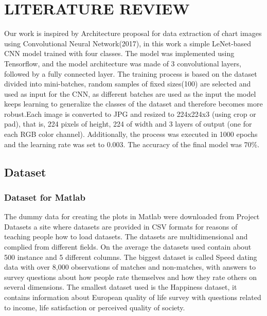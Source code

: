 \documentclass[12pt, a4paper,oneside]{report}
\begin{document}
\chapter{LITERATURE REVIEW}
Our work is inspired by Architecture proposal for data extraction of chart images using Convolutional Neural Network(2017), in this work a simple 
LeNet-based CNN model trained with four classes. The model was implemented using Tensorflow, and the model architecture was made of 3 convolutional layers, followed by a fully connected layer. The training process is based on the dataset divided into mini-batches, random samples of fixed sizes(100) are selected and used as input for the CNN, as different batches are used as the input the model keeps learning to generalize the classes of the dataset and therefore becomes more robust.Each image is converted to JPG and resized to 224x224x3 (using crop or pad), that is, 224 pixels of height, 224 of width and 3 layers of output (one for each RGB color channel). Additionally, the process was executed in 1000 epochs and the learning rate was set to 0.003. The accuracy of the final model was 70\%.

\section{Dataset}

\subsection{Dataset for Matlab}
The dummy data for creating the plots in Matlab were downloaded from Project Datasets \cite{wikiped} a site where datasets are provided in CSV formats for reasons of teaching people how to load datasets.
The datasets are multidimensional and complied from different fields. On the average the datasets used contain about 500 instance and 5 different columns. The biggest dataset is called Speed dating data with over 8,000 observations of matches and non-matches, with answers to survey questions about how people rate themselves and how they rate others on several dimensions. The smallest dataset
used is the Happiness dataset, it contains information about European quality of life survey with questions related to income, life satisfaction or perceived quality of society.
\end{document}
